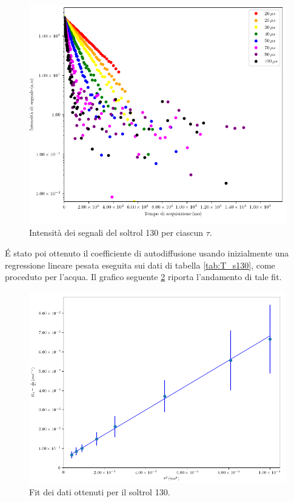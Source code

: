 \begin{figure}[p]
\centering
\includegraphics[width=\columnwidth]{Figure/SOLTROL130_SigTSig.png}
\caption{Intensità dei segnali del soltrol 130 per ciascun $\tau$.}
\label{fig:S_s130}
\end{figure}
\newpage
\'E stato poi ottenuto il coefficiente di autodiffusione usando inizialmente una regressione lineare pesata eseguita sui dati di tabella \ref{tab:T_s130}, come proceduto per l'acqua.
Il grafico seguente \ref{fig:Df_s130} riporta l'andamento di tale fit.

\begin{figure}[p]
\centering
\includegraphics[width=\columnwidth]{Figure/SOLTROL130_calc.png}
\caption{Fit dei dati ottenuti per il soltrol 130.}
\label{fig:Df_s130}
\end{figure}

